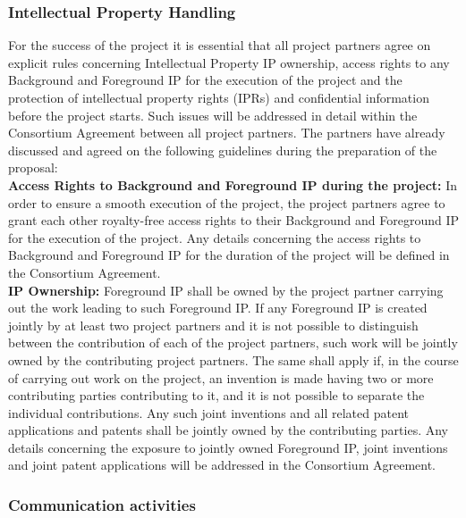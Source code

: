 \subsubsection{Intellectual Property Handling}
\label{sec:iprhandling}
For the success of the project it is essential that all project partners agree on explicit rules concerning Intellectual Property IP ownership, access rights to any Background and Foreground IP for the execution of the project and the protection of intellectual property rights (IPRs) and confidential information before the project starts. Such issues will be addressed in detail within the Consortium Agreement between all project partners. The partners have already discussed and agreed on the following guidelines during the preparation of the proposal:\\
\textbf{Access Rights to Background and Foreground IP during the project:} In order to ensure a smooth execution of the project, the project partners agree to grant each other royalty-free access rights to their Background and Foreground IP for the execution of the project. Any details concerning the access rights to Background and Foreground IP for the duration of the project will be defined in the Consortium Agreement.\\
\textbf{IP Ownership:} Foreground IP shall be owned by the project partner carrying out the work leading to such Foreground IP. If any Foreground IP is created jointly by at least two project partners and it is not possible to distinguish between the contribution of each of the project partners, such work will be jointly owned by the contributing project partners. The same shall apply if, in the course of carrying out work on the project, an invention is made having two or more contributing parties contributing to it, and it is not possible to separate the individual contributions. Any such joint inventions and all related patent applications and patents shall be jointly owned by the contributing parties. Any details concerning the exposure to jointly owned Foreground IP, joint inventions and joint patent applications will be addressed in the Consortium Agreement.



\subsubsection{Communication activities}
\label{sec:communicationact}

